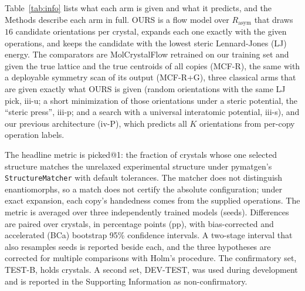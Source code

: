 \documentclass[journal=acsodf,manuscript=article]{achemso}
\begin{document}
Table~\ref{tab:info} lists what each arm is given and what it predicts, and the Methods
describe each arm in full. OURS is a flow model over $R_{\text{asym}}$ that draws $16$ candidate
orientations per crystal, expands each one exactly with the given operations, and keeps
the candidate with the lowest steric Lennard-Jones (LJ) energy. The comparators are
MolCrystalFlow retrained on our training set and given the true lattice and the true
centroids of all copies (MCF-R), the same with a deployable symmetry scan of its output
(MCF-R+G), three classical arms that are given exactly what OURS is given (random
orientations with the same LJ pick, iii-u; a short minimization of those orientations under
a steric potential, the ``steric press'', iii-p; and a search with a
universal interatomic potential, iii-s), and our previous architecture (iv-P), which
predicts all $K$ orientations from per-copy operation labels.

The headline metric is picked@1: the fraction of crystals whose one selected structure
matches the unrelaxed experimental structure under pymatgen's
\texttt{StructureMatcher}\cite{ong2013pymatgen} with default tolerances. The matcher does
not distinguish enantiomorphs, so a match does not certify the absolute configuration;
under exact expansion, each copy's handedness comes from the supplied operations. The
metric is averaged over three independently trained models (seeds). Differences are paired over crystals,
in percentage points (pp), with bias-corrected and accelerated (BCa) bootstrap 95\%
confidence intervals. A two-stage interval that also resamples seeds is reported beside
each, and the three hypotheses are corrected for multiple comparisons with Holm's
procedure. The confirmatory set, TEST-B,
holds \nN{} crystals. A second set, DEV-TEST, was used during development and is reported
in the Supporting Information as non-confirmatory.
\end{document}
